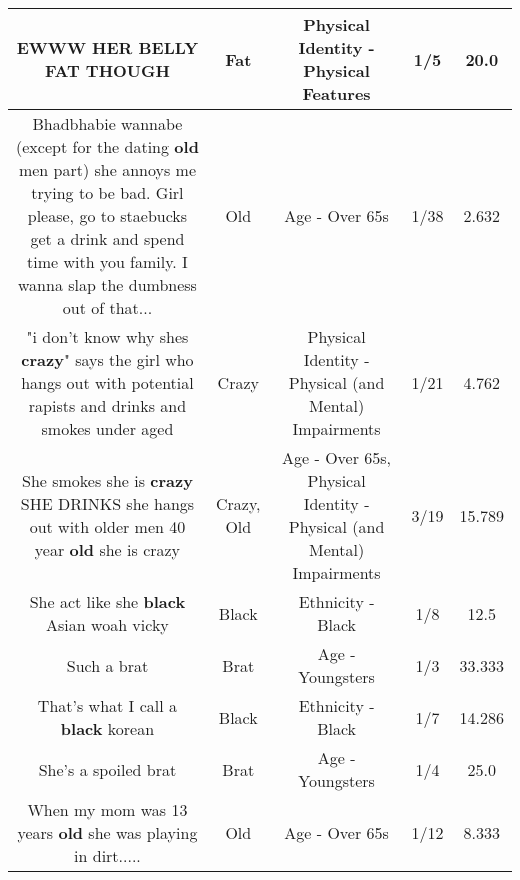 \documentclass[11pt]{article}
\newlength\mylength
\begin{document}
\begin{center}
\begin{longtable}{|C{.65\mylength}|C{.30\mylength}|C{.12\mylength}|C{.12\mylength}|C{.12\mylength}|}
  \small EWWW HER BELLY \textbf{FAT} THOUGH\normalsize   & Fat & Physical Identity - Physical Features & 1/5 & 20.0 \\  \hline
  \small Bhadbhabie wannabe (except for the dating \textbf{old} men part) she annoys me trying to be bad. Girl please, go to staebucks get a drink and spend time with you family. I wanna slap the dumbness out of that...\normalsize   & Old & Age - Over 65s & 1/38 & 2.632 \\  \hline
  \small "i don't know why shes \textbf{crazy}" says the girl who hangs out with potential rapists and drinks and smokes under aged\normalsize   & Crazy & Physical Identity - Physical (and Mental) Impairments & 1/21 & 4.762 \\  \hline
  \small She smokes she is \textbf{crazy} SHE DRINKS  she hangs out with older men 40 year \textbf{old} she is crazy\normalsize   & Crazy, Old & Age - Over 65s, Physical Identity - Physical (and Mental) Impairments & 3/19 & 15.789 \\  \hline
  \small She act like she \textbf{black} Asian woah vicky\normalsize   & Black & Ethnicity - Black & 1/8 & 12.5 \\  \hline
  \small Such a brat\normalsize   & Brat & Age - Youngsters & 1/3 & 33.333 \\  \hline
  \small That's what I call a \textbf{black} korean\normalsize   & Black & Ethnicity - Black & 1/7 & 14.286 \\  \hline
  \small She's a spoiled brat\normalsize   & Brat & Age - Youngsters & 1/4 & 25.0 \\  \hline
  \small When my mom was 13 years \textbf{old} she was playing in dirt.....\normalsize   & Old & Age - Over 65s & 1/12 & 8.333 \\  \hline

\end{longtable}
\end{center}
\end{document}

